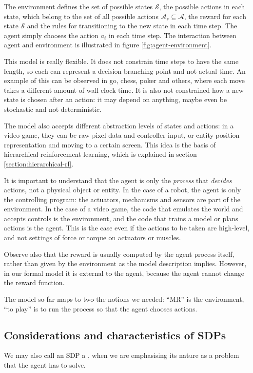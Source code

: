 The environment defines the set of possible states $\mathcal{S}$, the possible
actions in each state, which belong to the set of all possible actions
$\mathcal{A}_s \subseteq \mathcal{A}$, the reward for each state $\mathcal{S}$
and the rules for transitioning to the new state in each time step. The agent
simply chooses the action $a_t$ in each time step. The interaction between agent
and environment is illustrated in figure \ref{fig:agent-environment}.


This model is really flexible. It does not constrain time steps to have the same
length, so each can represent a decision branching point and not actual time. An
example of this can be observed in go, chess, poker and others, where each move
takes a different amount of wall clock time. It is also not constrained how a new
state is chosen after an action: it may depend on anything, maybe even be
stochastic and not deterministic.

The model also accepts different abstraction levels of states and actions: in a
video game, they can be raw pixel data and controller input, or entity position
representation and moving to a certain screen. This idea is the basis of
hierarchical reinforcement learning, which is explained in section
\ref{section:hierarchical-rl}.

It is important to understand that the agent is only the \emph{process} that
\emph{decides} actions, not a physical object or entity. In the case of a robot, the
agent is only the controlling program: the actuators, mechanisms and sensors are part
of the environment. In the case of a video game, the code that emulates
the world and accepts controls is the environment, and the code that trains a
model or plans actions is the agent. This is the case even if the actions to be
taken are high-level, and not settings of force or torque on actuators or
muscles.

Observe also that the reward is usually computed by the agent process itself,
rather than given by the environment as the model description implies. However,
in our formal model it is external to the agent, because the agent cannot change
the reward function.

The model so far maps to two the notions we needed: ``\acl{MR}'' is the environment,
``to play'' is to run the process so that the agent chooses actions.
\subsection{Considerations and characteristics of \acp{SDP}}
We may also call an \ac{SDP} a , when we are emphasising its nature
as a problem that the agent has to solve.

